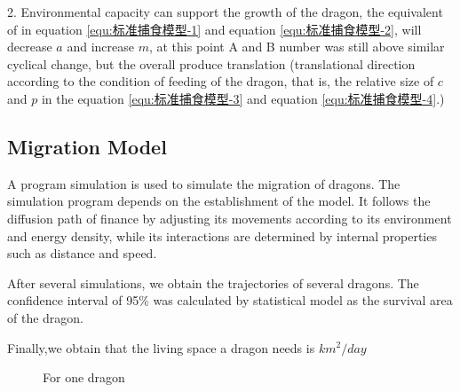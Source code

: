 2. Environmental capacity can support the growth of the dragon, the equivalent of in equation \eqref{equ:标准捕食模型-1} and equation \eqref{equ:标准捕食模型-2}, will decrease $a$ and increase $m$, at this point A and B number was still above similar cyclical change, but the overall produce translation (translational direction according to the condition of feeding of the dragon, that is, the relative size of $c$ and $p$ in the equation \eqref{equ:标准捕食模型-3} and equation \eqref{equ:标准捕食模型-4}.)





\subsection{Migration Model}

A program simulation is used to simulate the migration of dragons. The simulation program depends on the establishment of the model. It follows the diffusion path of finance by adjusting its movements according to its environment and energy density, while its interactions are determined by internal properties such as distance and speed.

After several simulations, we obtain the trajectories of several dragons. The confidence interval of 95\% was calculated by statistical model as the survival area of the dragon.

Finally,we obtain that the living space a dragon needs is $km^2/day$

\begin{figure}[htbp]
    \centering
    \caption{For one dragon}
    \label{fig:100年迁移}
\end{figure}

